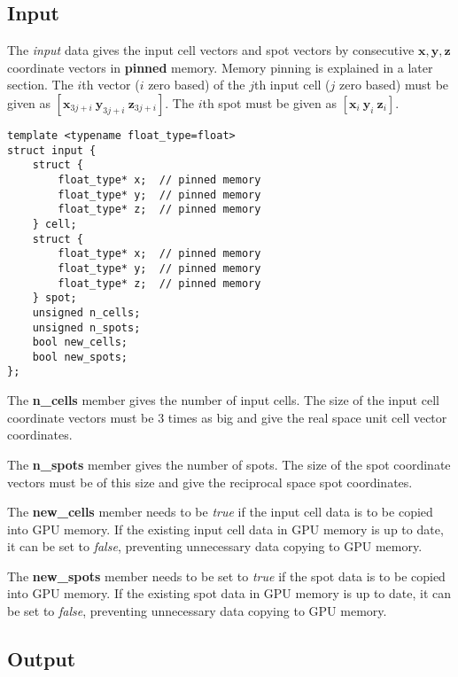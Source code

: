 \documentclass[a4paper,10pt]{article}
\newcommand{\vect}[1]{\mathbf{#1}}
\begin{document}
\subsection{Input}

The \emph{input} data gives the input cell vectors and spot vectors by consecutive $\vect{x},\vect{y},\vect{z}$ coordinate vectors in \textbf{pinned} memory. Memory pinning is explained in a later section. The $i$th vector ($i$ zero based) of the $j$th input cell ($j$ zero based) must be given as $[\vect{x}_{3j+i}\ \vect{y}_{3j+i}\ \vect{z}_{3j+i}]$. The $i$th spot must be given as $[\vect{x}_i\ \vect{y}_i\ \vect{z}_i]$.
%
\begin{lstlisting}
template <typename float_type=float>
struct input {
    struct {
        float_type* x;  // pinned memory
        float_type* y;  // pinned memory
        float_type* z;  // pinned memory
    } cell;
    struct {
        float_type* x;  // pinned memory
        float_type* y;  // pinned memory
        float_type* z;  // pinned memory
    } spot;
    unsigned n_cells;
    unsigned n_spots;
    bool new_cells;
    bool new_spots;
};
\end{lstlisting}
%
The \textbf{n\_cells} member gives the number of input cells. The size of the input cell coordinate vectors must be $3$ times as big and give the real space unit cell vector coordinates.

The \textbf{n\_spots} member gives the number of spots. The size of the spot coordinate vectors must be of this size and give the reciprocal space spot coordinates.

The \textbf{new\_cells} member needs to be \emph{true} if the input cell data is to be copied into GPU memory. If the existing input cell data in GPU memory is up to date, it can be set to \emph{false}, preventing unnecessary data copying to GPU memory.

The \textbf{new\_spots} member needs to be set to \emph{true} if the spot data is to be copied into GPU memory. If the existing spot data in GPU memory is up to date, it can be set to \emph{false}, preventing unnecessary data copying to GPU memory.

\subsection{Output}
\end{document}
